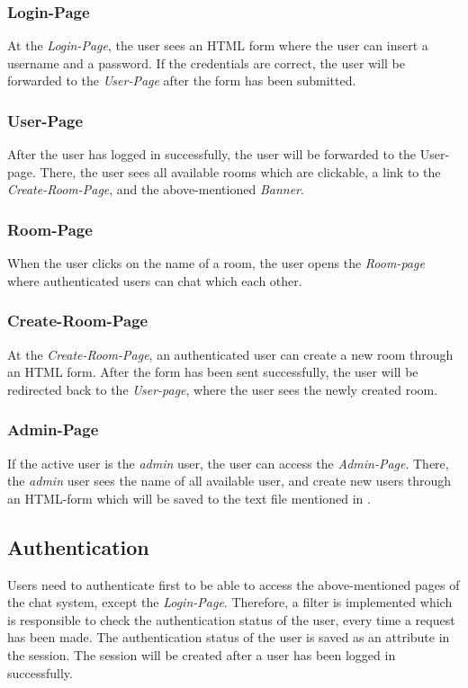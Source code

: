 \subsubsection{Login-Page}\label{subsubsec:02_design_routes_login}
At the \textit{Login-Page}, the user sees an HTML form where the user can insert a username and a password. If the credentials are correct, the user will be forwarded to the \textit{User-Page} after the form has been submitted.

\subsubsection{User-Page}\label{subsubsec:02_design_routes_userpage}
After the user has logged in successfully, the user will be forwarded to the User-page. There, the user sees all available rooms which are clickable, a link to the \textit{Create-Room-Page}, and the above-mentioned \textit{Banner}.

\subsubsection{Room-Page}\label{subsubsec:02_design_routes_room}
When the user clicks on the name of a room, the user opens the \textit{Room-page} where authenticated users can chat which each other.

\subsubsection{Create-Room-Page}\label{subsubsec:02_design_routes_createroom}
At the \textit{Create-Room-Page}, an authenticated user can create a new room through an HTML form. After the form has been sent successfully, the user will be redirected back to the \textit{User-page}, where the user sees the newly created room.

\subsubsection{Admin-Page}\label{subsubsec:02_design_routes_admin}
If the active user is the \textit{admin} user, the user can access the \textit{Admin-Page}. There, the \textit{admin} user sees the name of all available user, and create new users through an HTML-form which will be saved to the text file mentioned in .


\subsection{Authentication}\label{subsec:02_design_authentication}
Users need to authenticate first to be able to access the above-mentioned pages of the chat system, except the \textit{Login-Page}. Therefore, a filter is implemented which is responsible to check the authentication status of the user, every time a request has been made.
The authentication status of the user is saved as an attribute in the session. The session will be created after a user has been logged in successfully.


